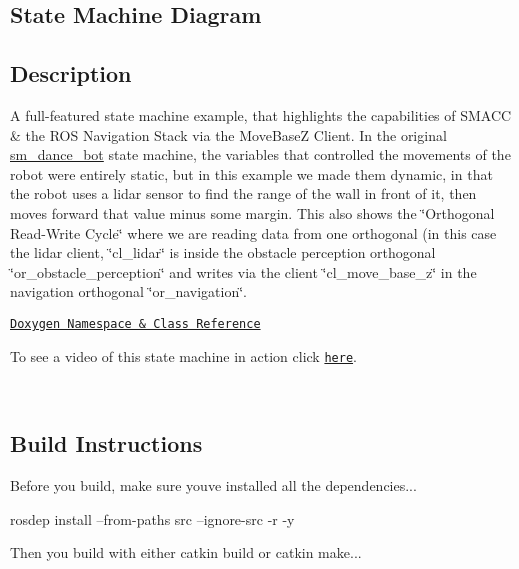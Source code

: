 \subsection*{State Machine Diagram}



\subsection*{Description}

A full-\/featured state machine example, that highlights the capabilities of S\+M\+A\+CC \& the R\+OS Navigation Stack via the Move\+BaseZ Client. In the original \hyperlink{namespacesm__dance__bot}{sm\+\_\+dance\+\_\+bot} state machine, the variables that controlled the movements of the robot were entirely static, but in this example we made them dynamic, in that the robot uses a lidar sensor to find the range of the wall in front of it, then moves forward that value minus some margin. This also shows the \char`\"{}\+Orthogonal Read-\/\+Write Cycle\char`\"{} where we are reading data from one orthogonal (in this case the lidar client, \char`\"{}cl\+\_\+lidar\char`\"{} is inside the obstacle perception orthogonal \char`\"{}or\+\_\+obstacle\+\_\+perception\char`\"{} and writes via the client \char`\"{}cl\+\_\+move\+\_\+base\+\_\+z\char`\"{} in the navigation orthogonal \char`\"{}or\+\_\+navigation\char`\"{}.~\newline


\href{https://reelrbtx.github.io/SMACC_Documentation/master/html/namespacesm__dance__bot__strikes__back.html}{\tt Doxygen Namespace \& Class Reference}

To see a video of this state machine in action click \href{https://www.youtube.com/watch?v=ucMr5Dg6UpU}{\tt here}.

 

~\newline


\subsection*{Build Instructions}

Before you build, make sure you\textquotesingle{}ve installed all the dependencies...


\begin{DoxyCode}
rosdep install --from-paths src --ignore-src -r -y 
\end{DoxyCode}


Then you build with either catkin build or catkin make...


